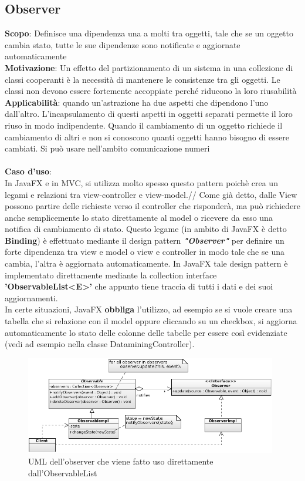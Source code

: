 \documentclass[a4paper, oneside]{book}
\begin{document}
\subsection*{Observer}
\textbf{Scopo}: Definisce una dipendenza una a molti tra oggetti, tale che se un oggetto cambia stato, tutte
le sue dipendenze sono notificate e aggiornate automaticamente
\\
\textbf{Motivazione}: Un effetto del partizionamento di un sistema in una collezione di classi cooperanti è la
necessità di mantenere le consistenze tra gli oggetti. Le classi non devono essere fortemente accoppiate perché riducono la loro riusabilità
\\
\textbf{Applicabilità}: quando un'astrazione ha due aspetti che dipendono l'uno dall'altro. L'incapsulamento di questi aspetti in oggetti separati permette il loro riuso in modo indipendente. Quando il cambiamento di un oggetto richiede il cambiamento di altri e non si conoscono quanti oggetti hanno bisogno di essere cambiati. Si può usare nell'ambito comunicazione numeri
\\
\\
\textbf{Caso d'uso}: 
\\
In JavaFX e in MVC, si utilizza molto spesso questo pattern poichè crea un legami e relazioni tra view-controller e view-model.//
Come già detto, dalle View possono partire delle richieste verso il controller che risponderà,
ma può richiedere anche semplicemente lo stato direttamente al model o ricevere
da esso una notifica di cambiamento di stato.
Questo legame (in ambito di JavaFX è detto \textbf{Binding}) è effettuato mediante il design
pattern \textbf{\textit{"Observer"}} per definire un forte dipendenza tra view e model o view e controller in modo tale
che se una cambia, l'altra è aggiornata automaticamente.
In JavaFX tale design pattern è implementato direttamente mediante la collection
interface \textbf{'ObservableList<E>'} che appunto tiene traccia di tutti i dati e dei suoi
aggiornamenti.\\
In certe situazioni, JavaFX \textbf{obbliga} l'utilizzo, ad esempio se si vuole creare una tabella che si relazione con il model oppure cliccando su un checkbox, si aggiorna automaticamente lo stato delle colonne delle tabelle per essere così evidenziate (vedi ad esempio nella classe DataminingController).\\
    \begin{figure}[htp]
\centering
\includegraphics[width=11cm]{observerUml.png}
\caption{UML dell'observer che viene fatto uso direttamente dall'ObservableList}
\label{fig:uml observer}
\end{figure}
\end{document}
